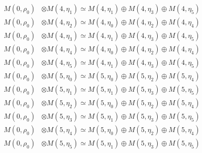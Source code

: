 \begin{align*}
M(0,\rho_{0}) &\otimes M(4,\eta_{1}) \simeq M(4,\eta_{1}) \oplus M(4,\eta_{3}) \oplus M(4,\eta_{5}) \\
M(0,\rho_{0}) &\otimes M(4,\eta_{2}) \simeq M(4,\eta_{0}) \oplus M(4,\eta_{2}) \oplus M(4,\eta_{4}) \\
M(0,\rho_{0}) &\otimes M(4,\eta_{3}) \simeq M(4,\eta_{1}) \oplus M(4,\eta_{3}) \oplus M(4,\eta_{5}) \\
M(0,\rho_{0}) &\otimes M(4,\eta_{4}) \simeq M(4,\eta_{0}) \oplus M(4,\eta_{2}) \oplus M(4,\eta_{4}) \\
M(0,\rho_{0}) &\otimes M(4,\eta_{5}) \simeq M(4,\eta_{1}) \oplus M(4,\eta_{3}) \oplus M(4,\eta_{5}) \\
M(0,\rho_{0}) &\otimes M(5,\eta_{0}) \simeq M(5,\eta_{0}) \oplus M(5,\eta_{2}) \oplus M(5,\eta_{4}) \\
M(0,\rho_{0}) &\otimes M(5,\eta_{1}) \simeq M(5,\eta_{1}) \oplus M(5,\eta_{3}) \oplus M(5,\eta_{5}) \\
M(0,\rho_{0}) &\otimes M(5,\eta_{2}) \simeq M(5,\eta_{0}) \oplus M(5,\eta_{2}) \oplus M(5,\eta_{4}) \\
M(0,\rho_{0}) &\otimes M(5,\eta_{3}) \simeq M(5,\eta_{1}) \oplus M(5,\eta_{3}) \oplus M(5,\eta_{5}) \\
M(0,\rho_{0}) &\otimes M(5,\eta_{4}) \simeq M(5,\eta_{0}) \oplus M(5,\eta_{2}) \oplus M(5,\eta_{4}) \\
M(0,\rho_{0}) &\otimes M(5,\eta_{5}) \simeq M(5,\eta_{1}) \oplus M(5,\eta_{3}) \oplus M(5,\eta_{5}) \\
\end{align*}

